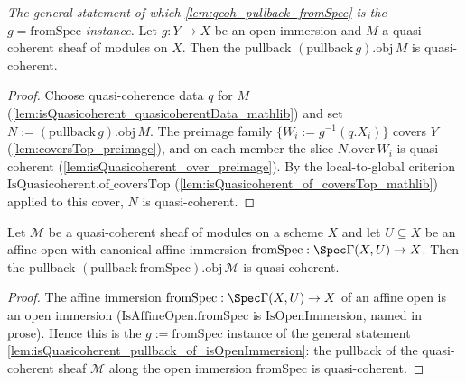 \begin{lemma}
  \label{lem:isQuasicoherent_pullback_of_isOpenImmersion}
  \textit{The general statement of which \cref{lem:qcoh_pullback_fromSpec} is the
  \(g = \mathrm{fromSpec}\) instance.}
  Let \(g : Y \to X\) be an open immersion and \(M\) a quasi-coherent sheaf of modules on \(X\). Then
  the pullback \((\mathrm{pullback}\,g).\mathrm{obj}\,M\) is quasi-coherent.
\end{lemma}
\begin{proof}
  Choose quasi-coherence data \(q\) for \(M\) (\cref{lem:isQuasicoherent_quasicoherentData_mathlib})
  and set \(N := (\mathrm{pullback}\,g).\mathrm{obj}\,M\). The preimage family
  \(\{W_i := g^{-1}(q.X_i)\}\) covers \(Y\) (\cref{lem:coversTop_preimage}), and on each member the
  slice \(N.\mathrm{over}\,W_i\) is quasi-coherent (\cref{lem:isQuasicoherent_over_preimage}). By the
  local-to-global criterion \(\mathrm{IsQuasicoherent.of\_coversTop}\)
  (\cref{lem:isQuasicoherent_of_coversTop_mathlib}) applied to this cover, \(N\) is quasi-coherent.
\end{proof}

\begin{lemma}
  \label{lem:qcoh_pullback_fromSpec}
  Let \(\mathcal{M}\) be a quasi-coherent sheaf of modules on a scheme \(X\) and let \(U \subseteq X\) be
  an affine open with canonical affine immersion \(\mathrm{fromSpec} : \Spec \Gamma(X, U) \to X\). Then
  the pullback \((\mathrm{pullback}\,\mathrm{fromSpec}).\mathrm{obj}\,\mathcal{M}\) is quasi-coherent.
\end{lemma}
\begin{proof}
  The affine immersion \(\mathrm{fromSpec} : \Spec \Gamma(X, U) \to X\) of an affine open is an open
  immersion (\(\mathrm{IsAffineOpen.fromSpec}\) is \(\mathrm{IsOpenImmersion}\), named in prose). Hence
  this is the \(g := \mathrm{fromSpec}\) instance of the general statement
  \cref{lem:isQuasicoherent_pullback_of_isOpenImmersion}: the pullback of the quasi-coherent sheaf
  \(\mathcal{M}\) along the open immersion \(\mathrm{fromSpec}\) is quasi-coherent.
\end{proof}

